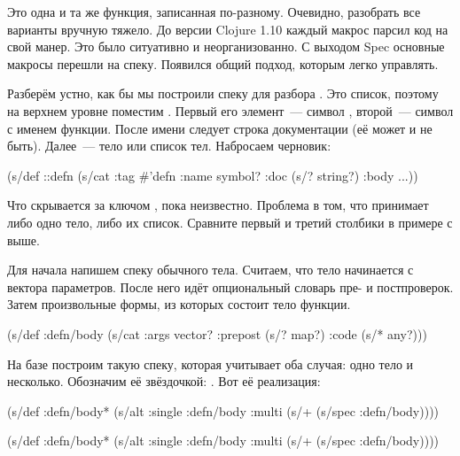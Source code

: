 \fi

Это одна и та же функция, записанная по-разному. Очевидно, разобрать все
варианты вручную тяжело. До версии Clojure 1.10 каждый макрос парсил код на свой
манер. Это было ситуативно и неорганизованно. С выходом Spec основные макросы
перешли на спеку. Появился общий подход, которым легко управлять.


Разберём устно, как бы мы построили спеку для разбора . Это список,
поэтому на верхнем уровне поместим . Первый его элемент~--- символ
, второй~--- символ с именем функции. После имени следует строка
документации (её может и не быть). Далее~--- тело или список тел. Набросаем
черновик:

\begin{clojure}
(s/def ::defn
  (s/cat :tag #{'defn}
         :name symbol?
         :doc (s/? string?)
         :body ...))
\end{clojure}

Что скрывается за ключом , пока неизвестно. Проблема в том, что
 принимает либо одно тело, либо их список. Сравните первый и третий
столбики в примере с  выше.

Для начала напишем спеку обычного тела. Считаем, что тело начинается с вектора
параметров. После него идёт опциональный словарь пре- и постпроверок. Затем
произвольные формы, из которых состоит тело функции.

\begin{clojure}
(s/def :defn/body
  (s/cat :args vector?
         :prepost (s/? map?)
         :code (s/* any?)))
\end{clojure}

На базе  построим такую спеку, которая учитывает оба случая:
одно тело и несколько. Обозначим её звёздочкой: . Вот её
реализация:

\ifnarrow

\begin{clojure}
(s/def :defn/body*
  (s/alt :single :defn/body
         :multi (s/+
                  (s/spec :defn/body))))
\end{clojure}

\else

\begin{clojure}
(s/def :defn/body*
  (s/alt :single :defn/body
         :multi (s/+ (s/spec :defn/body))))
\end{clojure}

